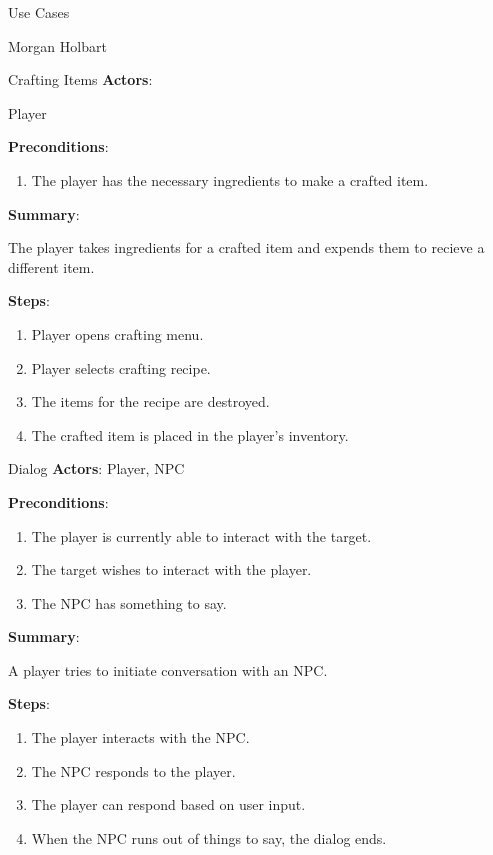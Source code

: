\documentclass[12pt]{report}
\begin{document}
\begin{section}{Use Cases}

\begin{subsection}{Morgan Holbart}
\begin{subsubsection}{Crafting Items}
\textbf{Actors}:

Player

\textbf{Preconditions}:

\begin{enumerate}
\item The player has the necessary ingredients to make a crafted item.
\end{enumerate}

\textbf{Summary}:

The player takes ingredients for a crafted item and expends them to
recieve a different item.

\textbf{Steps}:

\begin{enumerate}
\item Player opens crafting menu.
\item Player selects crafting recipe.
\item The items for the recipe are destroyed.
\item The crafted item is placed in the player's inventory.
\end{enumerate}
\end{subsubsection}

\begin{subsubsection}{Dialog}
\textbf{Actors}: Player, NPC

\textbf{Preconditions}:

\begin{enumerate}
\item The player is currently able to interact with the target.
\item The target wishes to interact with the player.
\item The NPC has something to say.
\end{enumerate}

\textbf{Summary}:

A player tries to initiate conversation with an NPC.

\textbf{Steps}:

\begin{enumerate}
\item The player interacts with the NPC.
\item The NPC responds to the player.
\item The player can respond based on user input.
\item When the NPC runs out of things to say, the dialog ends.
\end{enumerate}
\end{subsubsection}


\end{subsection}
\end{section}
\end{document}
